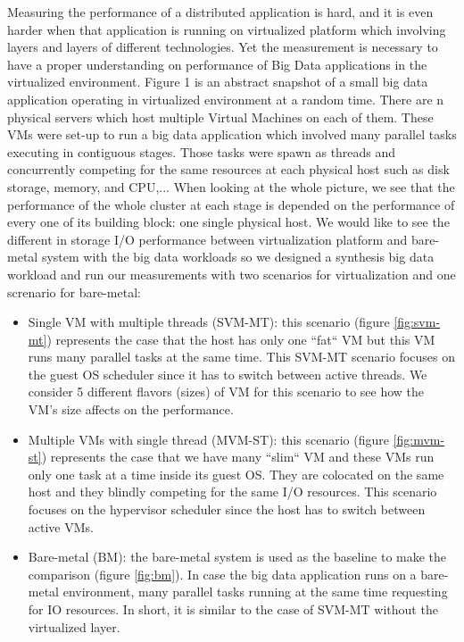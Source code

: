 \documentclass{acmsig}
\begin{document}
Measuring the performance of a distributed application is hard, and it is even harder when that application is running on virtualized platform which involving layers and layers of different technologies. Yet the measurement is necessary to have a proper understanding on performance of Big Data applications in the virtualized environment. Figure 1 is an abstract snapshot of a small big data application operating in virtualized environment at a random time. There are n physical servers which host multiple Virtual Machines on each of them. These VMs were set-up to run a big data application which involved many parallel tasks executing in contiguous stages. Those tasks were spawn as threads and concurrently competing for the same resources at each physical host such as disk storage, memory, and CPU,... When looking at the whole picture, we see that the performance of the whole cluster at each stage is depended on the performance of every one of its building block: one single physical host. We would like to see the different in storage I/O performance between virtualization platform and bare-metal system with the big data workloads so we designed a synthesis big data workload and run our measurements with two scenarios for virtualization and one screnario for bare-metal:
\begin{itemize}
\item Single VM with multiple threads (SVM-MT): this scenario (figure \ref{fig:svm-mt}) represents the case that the host has only one ``fat`` VM but this VM runs many parallel tasks at the same time. This SVM-MT scenario focuses on the guest OS scheduler since it has to switch between active threads. We consider 5 different flavors (sizes) of VM for this scenario to see how the VM's size affects on the performance.
\item Multiple VMs with single thread (MVM-ST): this scenario (figure \ref{fig:mvm-st}) represents the case that we have many ``slim`` VM and these VMs run only one task at a time inside its guest OS. They are colocated on the same host and they blindly competing for the same I/O resources. This scenario focuses on the hypervisor scheduler since the host has to switch between active VMs.
\item Bare-metal (BM): the bare-metal system is used as the baseline to make the comparison (figure \ref{fig:bm}). In case the big data application runs on a bare-metal environment, many parallel tasks running at the same time requesting for IO resources. In short, it is similar to the case of SVM-MT without the virtualized layer.
\end{itemize}
\end{document}
